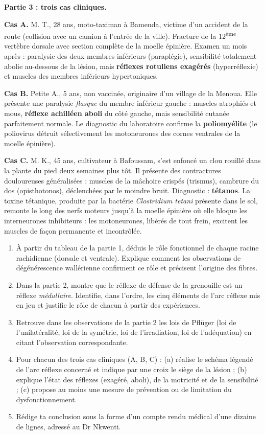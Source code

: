 \documentclass[11pt]{article}
\newcounter{popsec}
\newcounter{popsub}
\newcommand{\courssub}[1]{%
  \stepcounter{popsub}%
  \par\vspace{9pt}\noindent{\popxbold\fontsize{11.5}{13}\selectfont\color{popink}{\color{poporange}\thepopsec.\thepopsub}\hspace{6pt}#1}\par\nopagebreak\vspace{4pt}
}
\begin{document}
\textbf{Partie 3 : trois cas cliniques.}

\textbf{Cas A.} M. T., 28 ans, moto-taximan à Bamenda, victime d'un accident de la route (collision avec un camion à l'entrée de la ville). Fracture de la 12\textsuperscript{ème} vertèbre dorsale avec section complète de la moelle épinière. Examen un mois après : paralysie des deux membres inférieurs (paraplégie), sensibilité totalement abolie au-dessous de la lésion, mais \textbf{réflexes rotuliens exagérés} (hyperréflexie) et muscles des membres inférieurs hypertoniques.

\textbf{Cas B.} Petite A., 5 ans, non vaccinée, originaire d'un village de la Menoua. Elle présente une paralysie \emph{flasque} du membre inférieur gauche : muscles atrophiés et mous, \textbf{réflexe achilléen aboli} du côté gauche, mais sensibilité cutanée parfaitement normale. Le diagnostic du laboratoire confirme la \textbf{poliomyélite} (le poliovirus détruit sélectivement les motoneurones des cornes ventrales de la moelle épinière).

\textbf{Cas C.} M. K., 45 ans, cultivateur à Bafoussam, s'est enfoncé un clou rouillé dans la plante du pied deux semaines plus tôt. Il présente des contractures douloureuses généralisées : muscles de la mâchoire crispés (trismus), cambrure du dos (opisthotonos), déclenchées par le moindre bruit. Diagnostic : \textbf{tétanos}. La toxine tétanique, produite par la bactérie \emph{Clostridium tetani} présente dans le sol, remonte le long des nerfs moteurs jusqu'à la moelle épinière où elle bloque les interneurones inhibiteurs : les motoneurones, libérés de tout frein, excitent les muscles de façon permanente et incontrôlée.

\courssub{Consignes}

\begin{enumerate}
\item À partir du tableau de la partie 1, déduis le rôle fonctionnel de chaque racine rachidienne (dorsale et ventrale). Explique comment les observations de dégénérescence wallérienne confirment ce rôle et précisent l'origine des fibres.
\item Dans la partie 2, montre que le réflexe de défense de la grenouille est un réflexe \emph{médullaire}. Identifie, dans l'ordre, les cinq éléments de l'arc réflexe mis en jeu et justifie le rôle de chacun à partir des expériences.
\item Retrouve dans les observations de la partie 2 les lois de Pflüger (loi de l'unilatéralité, loi de la symétrie, loi de l'irradiation, loi de l'adéquation) en citant l'observation correspondante.
\item Pour chacun des trois cas cliniques (A, B, C) : (a) réalise le schéma légendé de l'arc réflexe concerné et indique par une croix le siège de la lésion ; (b) explique l'état des réflexes (exagéré, aboli), de la motricité et de la sensibilité ; (c) propose au moins une mesure de prévention ou de limitation du dysfonctionnement.
\item Rédige ta conclusion sous la forme d'un compte rendu médical d'une dizaine de lignes, adressé au Dr Nkwenti.
\end{enumerate}
\end{document}
